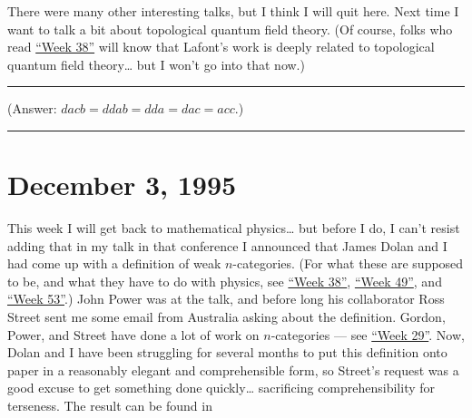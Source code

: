 \documentclass{article}
\renewcommand{\texttt}[1]{%
  \begingroup
  \ttfamily
  \begingroup\lccode`~=`/\lowercase{\endgroup\def~}{/\discretionary{}{}{}}%
  \begingroup\lccode`~=`[\lowercase{\endgroup\def~}{[\discretionary{}{}{}}%
  \begingroup\lccode`~=`.\lowercase{\endgroup\def~}{.\discretionary{}{}{}}%
  \catcode`/=\active\catcode`[=\active\catcode`.=\active
  \scantokens{#1\noexpand}%
  \endgroup
}
\begin{document}

There were many other interesting talks, but I think I will quit here.
Next time I want to talk a bit about topological quantum field theory.
(Of course, folks who read \protect\hyperlink{week38}{``Week 38''} will
know that Lafont's work is deeply related to topological quantum field
theory\ldots{} but I won't go into that now.)

\begin{center}\rule{0.5\linewidth}{0.5pt}\end{center}

(Answer: \(dacb = ddab = dda = dac = acc\).)

\begin{center}\rule{0.5\linewidth}{0.5pt}\end{center}
\hypertarget{week71}{%
\section{December 3, 1995}\label{week71}}

This week I will get back to mathematical physics\ldots{} but before I
do, I can't resist adding that in my talk in that conference I announced
that James Dolan and I had come up with a definition of weak
\(n\)-categories. (For what these are supposed to be, and what they have
to do with physics, see \protect\hyperlink{week38}{``Week 38''},
\protect\hyperlink{week49}{``Week 49''}, and
\protect\hyperlink{week53}{``Week 53''}.) John Power was at the talk,
and before long his collaborator Ross Street sent me some email from
Australia asking about the definition. Gordon, Power, and Street have
done a lot of work on \(n\)-categories --- see
\protect\hyperlink{week29}{``Week 29''}. Now, Dolan and I have been
struggling for several months to put this definition onto paper in a
reasonably elegant and comprehensible form, so Street's request was a
good excuse to get something done quickly\ldots{} sacrificing
comprehensibility for terseness. The result can be found in
\end{document}
